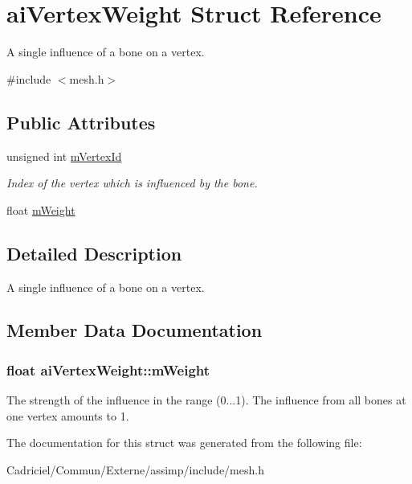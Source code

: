 \hypertarget{structai_vertex_weight}{}\section{ai\+Vertex\+Weight Struct Reference}
\label{structai_vertex_weight}


A single influence of a bone on a vertex.  




{\ttfamily \#include $<$mesh.\+h$>$}

\subsection*{Public Attributes}
\begin{DoxyCompactItemize}
\item 
unsigned int \hyperlink{structai_vertex_weight_af6269cf6a0f02e5ae870a72046d58f4f}{m\+Vertex\+Id}\hypertarget{structai_vertex_weight_af6269cf6a0f02e5ae870a72046d58f4f}{}\label{structai_vertex_weight_af6269cf6a0f02e5ae870a72046d58f4f}

\begin{DoxyCompactList}\small\item\em Index of the vertex which is influenced by the bone. \end{DoxyCompactList}\item 
float \hyperlink{structai_vertex_weight_abab9c49baabc2cafef9ac840f59e61b8}{m\+Weight}
\end{DoxyCompactItemize}


\subsection{Detailed Description}
A single influence of a bone on a vertex. 

\subsection{Member Data Documentation}
\subsubsection[{\texorpdfstring{m\+Weight}{mWeight}}]{\setlength{\rightskip}{0pt plus 5cm}float ai\+Vertex\+Weight\+::m\+Weight}\hypertarget{structai_vertex_weight_abab9c49baabc2cafef9ac840f59e61b8}{}\label{structai_vertex_weight_abab9c49baabc2cafef9ac840f59e61b8}
The strength of the influence in the range (0...1). The influence from all bones at one vertex amounts to 1. 

The documentation for this struct was generated from the following file\+:\begin{DoxyCompactItemize}
\item 
Cadriciel/\+Commun/\+Externe/assimp/include/mesh.\+h\end{DoxyCompactItemize}

